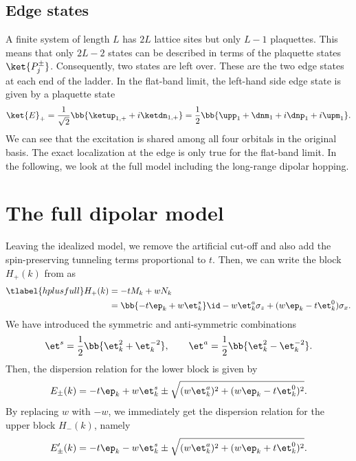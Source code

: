 \subsection{Edge states}
A finite system of length $L$ has $2L$ lattice sites but only $L-1$ plaquettes. This means that only $2L - 2$ states can be described in terms of the plaquette states $\ket{P_j^\pm}$.
Consequently, two states are left over.
These are the two edge states at each end of the ladder. In the flat-band limit, the left-hand side edge state is given by  a plaquette state
\begin{align}
    \ket{E}_+ = \frac{1}{\sqrt{2}} \bb{ \ketup_{1,+} + i \ketdn_{1,+} } = \frac{1}{2} \bb{ \upp_1 + \dnm_1 + i\dnp_1 + i\upm_1 }.
\end{align}
We can see that the excitation is shared among all four orbitals in the original basis.
The exact localization at the edge is only true for the flat-band limit.
In the following, we look at the full model including the long-range dipolar hopping.


\section{The full dipolar model}
Leaving the idealized model, we remove the artificial cut-off and also add the spin-preserving tunneling terms proportional to $t$.
Then, we can write the block $H_+(k)$ from  as
\begin{align} \tlabel{hplusfull}
    H_+(k) &= -t M_k + w N_k \\
           &= \bb{-t \ep_k + w \et^{s}_k} \id - w\et^{a}_k \sigma_z + (w \ep_k - t \et^0_k) \sigma_x.
\end{align}
We have introduced the symmetric and anti-symmetric combinations
\begin{align}
    \et^s = \frac{1}{2} \bb{ \et^2_k + \et^{-2}_{k} }, \qquad
    \et^a = \frac{1}{2} \bb{ \et^2_k - \et^{-2}_{k} }.
\end{align}
Then, the dispersion relation for the lower block is given by
\begin{align}
    E_\pm(k) = -t \ep_k + w \et^s_k \pm \sqrt{(w \et^a_k)^2+(w \ep_k - t \et^0_k)^2}.
\end{align}
By replacing $w$ with $-w$, we immediately get the dispersion relation for the upper block $H_-(k)$, namely
\begin{align}
    E'_\pm(k) = -t \ep_k - w \et^s_k \pm \sqrt{(w \et^a_k)^2+(w \ep_k + t \et^0_k)^2}.
\end{align}

